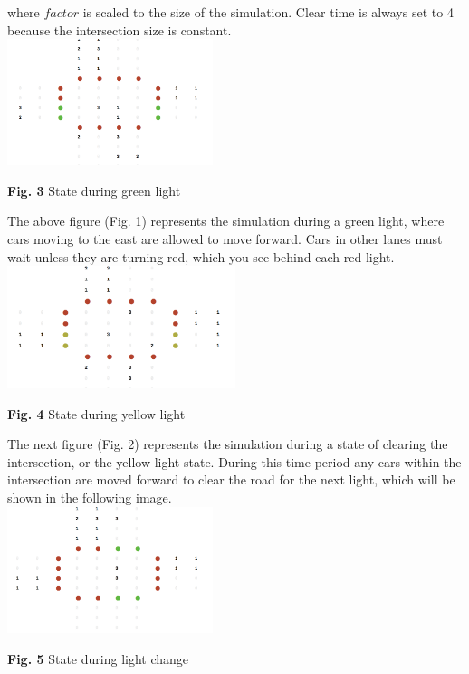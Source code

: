 \documentclass[conference]{IEEEtran}
\begin{document}
where $factor$ is scaled to the size of the simulation. Clear time is always set to 4 because the intersection size is constant. \\

\includegraphics[width=0.45\textwidth]{green}
\begin{center}
	\textbf{Fig. 3} State during green light  \\
\end{center}

The above figure (Fig. 1) represents the simulation during a green light, where cars moving to the east are allowed to move forward. Cars in other lanes must wait unless they are turning red, which you see behind each red light. \\

\includegraphics[width=0.5\textwidth]{yellow}
\begin{center}
	\textbf{Fig. 4} State during yellow light  \\
\end{center}

The next figure (Fig. 2) represents the simulation during a state of clearing the intersection, or the yellow light state. During this time period any cars within the intersection are moved forward to clear the road for the next light, which will be shown in the following image. \\

\includegraphics[width=0.45\textwidth]{red}
\begin{center}
	\textbf{Fig. 5} State during light change  \\
\end{center}
\end{document}
